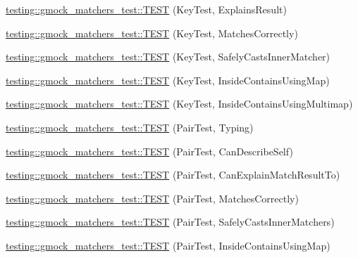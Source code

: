 \begin{DoxyCompactItemize}
\item 
\mbox{\hyperlink{namespacetesting_1_1gmock__matchers__test_a38169c972e14fef59a41e532fb5b431e}{testing\+::gmock\+\_\+matchers\+\_\+test\+::\+T\+E\+ST}} (Key\+Test, Explains\+Result)
\item 
\mbox{\hyperlink{namespacetesting_1_1gmock__matchers__test_a39f4f76617c414ab715b701eb82eeee4}{testing\+::gmock\+\_\+matchers\+\_\+test\+::\+T\+E\+ST}} (Key\+Test, Matches\+Correctly)
\item 
\mbox{\hyperlink{namespacetesting_1_1gmock__matchers__test_a6b05d274d57a4aa120bb497c34ce3a68}{testing\+::gmock\+\_\+matchers\+\_\+test\+::\+T\+E\+ST}} (Key\+Test, Safely\+Casts\+Inner\+Matcher)
\item 
\mbox{\hyperlink{namespacetesting_1_1gmock__matchers__test_af9f4e295413489a7e3acafc59584c3c4}{testing\+::gmock\+\_\+matchers\+\_\+test\+::\+T\+E\+ST}} (Key\+Test, Inside\+Contains\+Using\+Map)
\item 
\mbox{\hyperlink{namespacetesting_1_1gmock__matchers__test_af90ca00690094484af6c34eadf4dd7c3}{testing\+::gmock\+\_\+matchers\+\_\+test\+::\+T\+E\+ST}} (Key\+Test, Inside\+Contains\+Using\+Multimap)
\item 
\mbox{\hyperlink{namespacetesting_1_1gmock__matchers__test_a5689064ea3fe50424dd1ea036d107aa8}{testing\+::gmock\+\_\+matchers\+\_\+test\+::\+T\+E\+ST}} (Pair\+Test, Typing)
\item 
\mbox{\hyperlink{namespacetesting_1_1gmock__matchers__test_a672ba279448f634fae495ed7dc9260bd}{testing\+::gmock\+\_\+matchers\+\_\+test\+::\+T\+E\+ST}} (Pair\+Test, Can\+Describe\+Self)
\item 
\mbox{\hyperlink{namespacetesting_1_1gmock__matchers__test_a4ee8f3967e3658cd7bd340558922f131}{testing\+::gmock\+\_\+matchers\+\_\+test\+::\+T\+E\+ST}} (Pair\+Test, Can\+Explain\+Match\+Result\+To)
\item 
\mbox{\hyperlink{namespacetesting_1_1gmock__matchers__test_acdb02e9ac603c91b35602751f6a81239}{testing\+::gmock\+\_\+matchers\+\_\+test\+::\+T\+E\+ST}} (Pair\+Test, Matches\+Correctly)
\item 
\mbox{\hyperlink{namespacetesting_1_1gmock__matchers__test_ad2110445fe8f2f8ca947540f2a400228}{testing\+::gmock\+\_\+matchers\+\_\+test\+::\+T\+E\+ST}} (Pair\+Test, Safely\+Casts\+Inner\+Matchers)
\item 
\mbox{\hyperlink{namespacetesting_1_1gmock__matchers__test_a9785412a9e786b1f81387204df577c73}{testing\+::gmock\+\_\+matchers\+\_\+test\+::\+T\+E\+ST}} (Pair\+Test, Inside\+Contains\+Using\+Map)
\item 

\end{DoxyCompactItemize}
